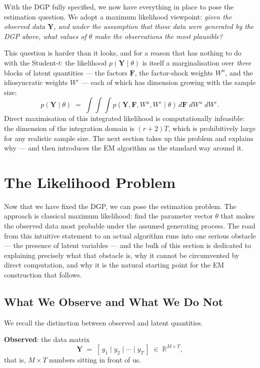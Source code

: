\documentclass[11pt, a4paper, oneside]{article}
\newcommand{\mY}{\mathbf{Y}}
\newcommand{\mF}{\mathbf{F}}
\begin{document}
With the DGP fully specified, we now have everything in place to pose
the estimation question. We adopt a maximum likelihood viewpoint:
\emph{given the observed data $\mY$, and under the assumption that those
data were generated by the DGP above, what values of $\theta$ make the
observations the most plausible?}

This question is harder than it looks, and for a reason that has nothing
to do with the Student-$t$: the likelihood $p(\mY \mid \theta)$ is itself
a marginalisation over \emph{three} blocks of latent quantities — the
factors $\mF$, the factor-shock weights $W^u$, and the idiosyncratic
weights $W^\varepsilon$ — each of which has dimension growing with the
sample size:
\[
p(\mY \mid \theta) \;=\; \int\!\!\int\!\!\int p(\mY, \mF, W^u, W^\varepsilon \mid \theta)\,
d\mF\; dW^u\; dW^\varepsilon.
\]
Direct maximisation of this integrated likelihood is computationally
infeasible: the dimension of the integration domain is $(r + 2)T$, which
is prohibitively large for any realistic sample size. The next section
takes up this problem and explains why — and then introduces the EM
algorithm as the standard way around it.

\newpage

\section{The Likelihood Problem}
\label{sec:likelihood}

Now that we have fixed the DGP, we can pose the
estimation problem. The approach is classical maximum likelihood: find
the parameter vector $\theta$ that makes the observed data most probable
under the assumed generating process. The road from this intuitive
statement to an actual algorithm runs into one serious obstacle — the
presence of latent variables — and the bulk of this section is dedicated
to explaining precisely what that obstacle is, why it cannot be
circumvented by direct computation, and why it is the natural starting
point for the EM construction that follows.

\subsection{What We Observe and What We Do Not}

We recall the distinction between observed and latent quantities. 

\textbf{Observed}: the data matrix
\[
\mY \;=\; [\,y_1 \mid y_2 \mid \cdots \mid y_T\,] \;\in\; \mathbb{R}^{M \times T},
\]
that is, $M \times T$ numbers sitting in front of us.
\end{document}

